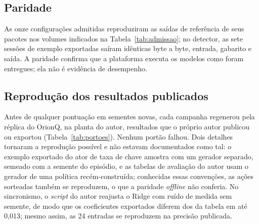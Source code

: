\documentclass[12pt]{article}
\begin{document}
\subsection{Paridade}

As onze configurações admitidas reproduziram as saídas de referência de seus
pacotes nos volumes indicados na Tabela~\ref{tab:admissao}; no detector, as sete
sessões de exemplo exportadas saíram idênticas byte a byte, entrada, gabarito e
saída. A paridade confirma que a plataforma executa os modelos
como foram entregues; ela não é evidência de desempenho.

\subsection{Reprodução dos resultados publicados}

Antes de qualquer pontuação em sementes novas, cada campanha regenerou pela
réplica do OrionQ, na planta do autor, resultados que o próprio autor publicou
ou exportou (Tabela~\ref{tab:portoes}). Nenhum portão falhou. Dois detalhes
tornaram a reprodução possível e não estavam documentados como tal: o exemplo
exportado do ator de taxa de chave amostra com um gerador separado, semeado com
a semente do episódio, e as tabelas de avaliação do autor usam o gerador de uma
política recém-construída; conhecidas essas convenções, as ações sorteadas
também se reproduzem, o que a paridade \textit{offline} não conferia. No
sincronismo, o \textit{script} do autor reajusta o Ridge com ruído de medida sem
semente, de modo que os coeficientes exportados diferem dos da tabela em até
0,013; mesmo assim, as 24 entradas se reproduzem na precisão publicada.
\end{document}
